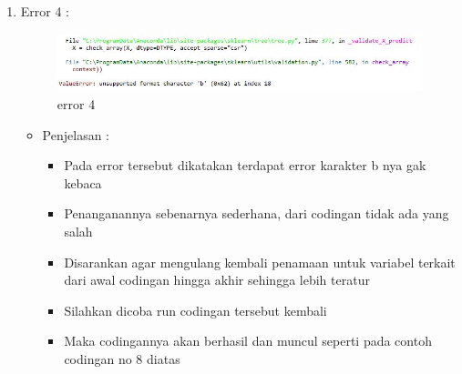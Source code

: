\begin{enumerate}
\par
\item Error 4	:
\par

\begin{figure}[ht]
\centering
\includegraphics[scale=0.4]{figures/error8.jpg}
\caption{error 4}
\label{contoh}
\end{figure}

\par

\par
\begin{itemize}
\item Penjelasan	: 
\begin{itemize}
\item Pada error tersebut dikatakan terdapat error karakter b nya gak kebaca
\item Penanganannya sebenarnya sederhana, dari codingan tidak ada yang salah
\item Disarankan agar mengulang kembali penamaan untuk variabel terkait dari awal codingan hingga akhir sehingga lebih teratur
\item Silahkan dicoba run codingan tersebut kembali
\item Maka codingannya akan berhasil dan muncul seperti pada contoh codingan no 8 diatas
\end{itemize}
\end{itemize}

\end{enumerate}